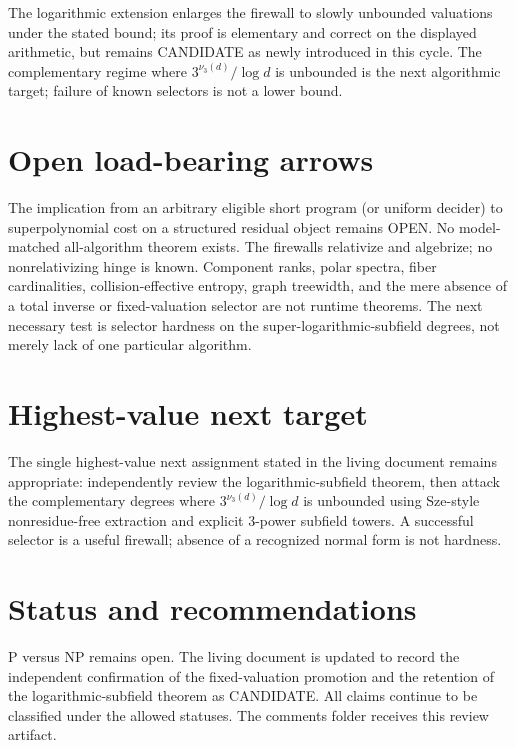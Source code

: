 \documentclass[11pt]{article}
\begin{document}
The logarithmic extension enlarges the firewall to slowly unbounded valuations under the stated bound; its proof is elementary and correct on the displayed arithmetic, but remains CANDIDATE as newly introduced in this cycle. The complementary regime where $3^{\nu_3(d)}/\log d$ is unbounded is the next algorithmic target; failure of known selectors is not a lower bound.

\section{Open load-bearing arrows}
The implication from an arbitrary eligible short program (or uniform decider) to superpolynomial cost on a structured residual object remains OPEN. No model-matched all-algorithm theorem exists. The firewalls relativize and algebrize; no nonrelativizing hinge is known. Component ranks, polar spectra, fiber cardinalities, collision-effective entropy, graph treewidth, and the mere absence of a total inverse or fixed-valuation selector are not runtime theorems. The next necessary test is selector hardness on the super-logarithmic-subfield degrees, not merely lack of one particular algorithm.

\section{Highest-value next target}
The single highest-value next assignment stated in the living document remains appropriate: independently review the logarithmic-subfield theorem, then attack the complementary degrees where $3^{\nu_3(d)}/\log d$ is unbounded using Sze-style nonresidue-free extraction and explicit $3$-power subfield towers. A successful selector is a useful firewall; absence of a recognized normal form is not hardness.

\section{Status and recommendations}
P versus NP remains open. The living document is updated to record the independent confirmation of the fixed-valuation promotion and the retention of the logarithmic-subfield theorem as CANDIDATE. All claims continue to be classified under the allowed statuses. The comments folder receives this review artifact.

\end{document}
